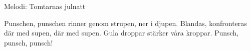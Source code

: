 \begin{song}

\begin{songmeta}
Melodi: Tomtarnas julnatt
\end{songmeta}

\begin{songtext}
Punschen, punschen rinner genom strupen,
ner i djupen.
Blandas, konfronteras där med supen,
där med supen.
Gula droppar stärker våra kroppar.
Punsch, punsch, punsch!
\end{songtext}

\end{song}
